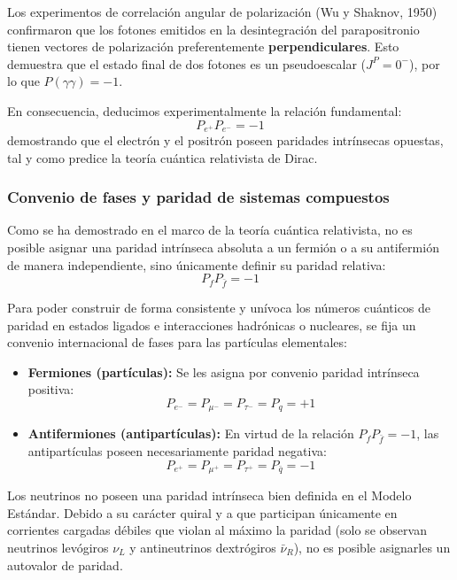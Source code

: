 Los experimentos de correlación angular de polarización (Wu y Shaknov, 1950) confirmaron que los fotones emitidos en la desintegración del parapositronio tienen vectores de polarización preferentemente \textbf{perpendiculares}. Esto demuestra que el estado final de dos fotones es un pseudoescalar ($J^P = 0^-$), por lo que $P(\gamma\gamma) = -1$.

En consecuencia, deducimos experimentalmente la relación fundamental:
\begin{equation}
    P_{e^+} P_{e^-} = -1
\end{equation}
demostrando que el electrón y el positrón poseen paridades intrínsecas opuestas, tal y como predice la teoría cuántica relativista de Dirac.
\subsubsection*{Convenio de fases y paridad de sistemas compuestos}

Como se ha demostrado en el marco de la teoría cuántica relativista, no es posible asignar una paridad intrínseca absoluta a un fermión o a su antifermión de manera independiente, sino únicamente definir su paridad relativa:
\begin{equation}
    P_f P_{\bar{f}} = -1
\end{equation}

Para poder construir de forma consistente y unívoca los números cuánticos de paridad en estados ligados e interacciones hadrónicas o nucleares, se fija un convenio internacional de fases para las partículas elementales:
\begin{itemize}
    \item \textbf{Fermiones (partículas):} Se les asigna por convenio paridad intrínseca positiva:
    \begin{equation}
        P_{e^-} = P_{\mu^-} = P_{\tau^-} = P_q = +1
    \end{equation}
    \item \textbf{Antifermiones (antipartículas):} En virtud de la relación $P_f P_{\bar{f}} = -1$, las antipartículas poseen necesariamente paridad negativa:
    \begin{equation}
        P_{e^+} = P_{\mu^+} = P_{\tau^+} = P_{\bar{q}} = -1
    \end{equation}
\end{itemize}

\begin{observacion}
Los neutrinos no poseen una paridad intrínseca bien definida en el Modelo Estándar. Debido a su carácter quiral y a que participan únicamente en corrientes cargadas débiles que violan al máximo la paridad (solo se observan neutrinos levógiros $\nu_L$ y antineutrinos dextrógiros $\bar{\nu}_R$), no es posible asignarles un autovalor de paridad.
\end{observacion}

